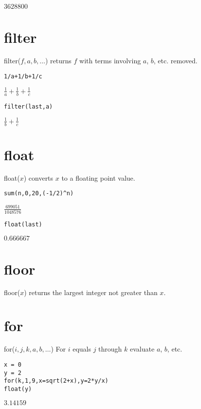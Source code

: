 $\displaystyle 3628800$

\section*{filter}
filter($f,a,b,\ldots$) returns $f$ with terms involving $a$, $b$, etc. removed.

\begin{Verbatim}[formatcom=\color{blue},samepage=true]
1/a+1/b+1/c
\end{Verbatim}

$\displaystyle \frac{1}{a}+\frac{1}{b}+\frac{1}{c}$

\begin{Verbatim}[formatcom=\color{blue},samepage=true]
filter(last,a)
\end{Verbatim}

$\displaystyle \frac{1}{b}+\frac{1}{c}$

\section*{float}
float($x$) converts $x$ to a floating point value.

\begin{Verbatim}[formatcom=\color{blue},samepage=true]
sum(n,0,20,(-1/2)^n)
\end{Verbatim}

$\displaystyle \frac{699051}{1048576}$

\begin{Verbatim}[formatcom=\color{blue},samepage=true]
float(last)
\end{Verbatim}

$\displaystyle 0.666667$

\section*{floor}
floor($x$) returns the largest integer not greater than $x$.

\section*{for}
for($i,j,k,a,b,\ldots$) For $i$ equals $j$ through $k$ evaluate $a$, $b$, etc.

\begin{Verbatim}[formatcom=\color{blue},samepage=true]
x = 0
y = 2
for(k,1,9,x=sqrt(2+x),y=2*y/x)
float(y)
\end{Verbatim}

$\displaystyle 3.14159$

